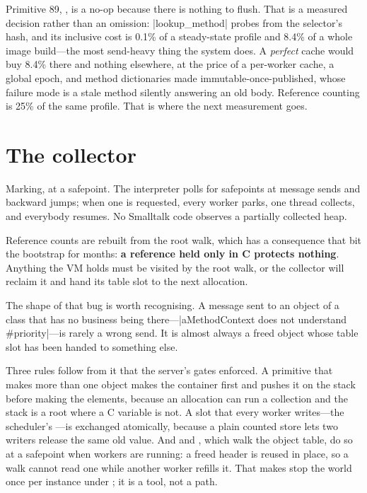 \begin{stnote}
Primitive 89, , is a no-op because there is nothing to flush.
That is a measured decision rather than an omission: \ct|lookup_method| probes
from the selector's hash, and its inclusive cost is 0.1\% of a steady-state
profile and 8.4\% of a whole image build---the most send-heavy thing the system
does. A \emph{perfect} cache would buy 8.4\% there and nothing elsewhere, at
the price of a per-worker cache, a global epoch, and method dictionaries made
immutable-once-published, whose failure mode is a stale method silently
answering an old body. Reference counting is 25\% of the same profile. That is
where the next measurement goes.
\end{stnote}

\section{The collector}

Marking, at a safepoint. The interpreter polls for safepoints at message sends
and backward jumps; when one is requested, every worker parks, one thread
collects, and everybody resumes. No Smalltalk code observes a partially
collected heap.

Reference counts are rebuilt from the root walk, which has a consequence that
bit the bootstrap for months: \textbf{a reference held only in C protects
nothing}. Anything the VM holds must be visited by the root walk, or the
collector will reclaim it and hand its table slot to the next allocation.

The shape of that bug is worth recognising. A message sent to an object of a
class that has no business being there---\ct|aMethodContext does not understand #priority|---is rarely a wrong send. It is almost always a freed
object whose table slot has been handed to something else.

Three rules follow from it that the server's gates enforced. A primitive
that makes more than one object makes the container first and pushes it on
the stack before making the elements, because an allocation can run a
collection and the stack is a root where a C variable is not. A slot that
every worker writes---the scheduler's ---is exchanged
atomically, because a plain counted store lets two writers release the same
old value. And  and , which walk the
object table, do so at a safepoint when workers are running: a freed header
is reused in place, so a walk cannot read one while another worker refills
it. That makes  stop the world once per instance under
; it is a tool, not a path.

